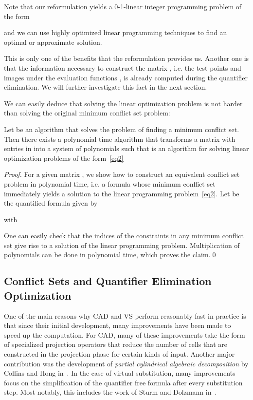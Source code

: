 \documentclass{llncs}
\begin{document}
Note that our reformulation yields a 0-1-linear integer programming
problem of the form

and we can use highly optimized linear programming techniques to find
an optimal or approximate solution.

This is only one of the benefits that the reformulation provides
us. Another one is that the information necessary to construct the
matrix , i.e. the test points and images under the evaluation
functions , is already computed during the quantifier
elimination. We will further investigate this fact in the next section. 

We can easily deduce that solving the linear optimization problem is not harder
than solving the original minimum conflict set problem:

\begin{theorem}
  Let  be an algorithm that solves the problem of finding a minimum
  conflict set. Then there exists a polynomial time algorithm  that
  transforms a matrix with entries in  into a system of polynomials
  such that  is an algorithm for solving linear
  optimization problems of the form~\eqref{eq2} 
\end{theorem}

\begin{proof}
  For a given matrix , we show how to construct an
  equivalent conflict set problem in polynomial time, i.e. a formula
   whose minimum conflict set immediately yields a solution to the linear
  programming problem~\eqref{eq2}. Let  be the quantified formula given by
  
  with
  
  One can easily check that the indices of the constraints in any minimum
  conflict set give rise to a solution of the linear programming
  problem. Multiplication of polynomials can be done in polynomial time, which
  proves the claim.\qed
\end{proof}

\subsection{Conflict Sets and Quantifier Elimination Optimization}

One of the main reasons why CAD and VS perform reasonably fast in practice is
that since their initial development, many improvements have been made to speed
up the computation.  For CAD, many of these improvements take the form of
specialized projection operators that reduce the number of cells that are
constructed in the projection phase for certain kinds of input. Another major
contribution was the development of \textit{partial cylindrical algebraic
  decomposition} by Collins and Hong in~\cite{hong}.  In the case of virtual
substitution, many improvements focus on the simplification of the quantifier
free formula after every substitution step. Most notably, this includes the work
of Sturm and Dolzmann in~\cite{dolzmann,sturm}.
\end{document}
